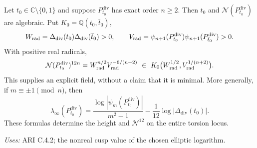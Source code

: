 \begin{proposition}\label{ari:C.4.3}
Let $t_0\in\mathbb C\setminus\{0,1\}$ and suppose $P^{\mathrm{div}}_{t_0}$ has
exact order $n\ge2$. Then $t_0$ and $\mathcal N(P^{\mathrm{div}}_{t_0})$ are algebraic.
Put $K_0=\mathbb Q(t_0,\bar t_0)$,
\[
 W_{\rm rad}=\Delta_{\mathrm{div}}(t_0)\Delta_{\mathrm{div}}(\bar t_0)>0,\qquad
 V_{\rm rad}=\psi_{n+1}(P^{\mathrm{div}}_{t_0})\psi_{n+1}(P^{\mathrm{div}}_{\bar t_0})>0.
\]
With positive real radicals,
\[
 \mathcal N(P^{\mathrm{div}}_{t_0})^{12n}=W_{\rm rad}^{n/2}V_{\rm rad}^{-6/(n+2)}
 \ \in\ K_0\bigl(W_{\rm rad}^{1/2},V_{\rm rad}^{1/(n+2)}\bigr).
\]
This supplies an explicit field, without a claim that it is minimal.
More generally, if $m\equiv\pm1\pmod n$, then
\[
 \lambda_\infty(P^{\mathrm{div}}_{t_0})
 =\frac{\log|\psi_m(P^{\mathrm{div}}_{t_0})|}{m^2-1}
       -\frac1{12}\log|\Delta_{\mathrm{div}}(t_0)|.
\]
These formulas determine the height and $\mathcal N^{12}$ on the entire
torsion locus.
\end{proposition}
\noindent\textit{Uses:} ARI C.4.2; the nonreal cusp value of the chosen elliptic logarithm.\par
